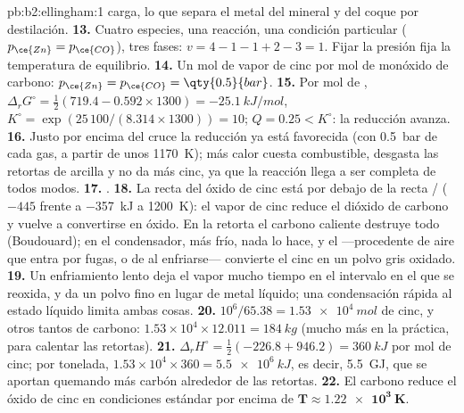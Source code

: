 \begin{solution}{pb:b2:ellingham:1}
carga, lo que separa el metal del mineral y del coque por destilación.
\textbf{13.} Cuatro especies, una reacción, una condición particular ($p_{\ce{Zn}} =
p_{\ce{CO}}$), tres fases: $v = 4 - 1 - 1 + 2 - 3 = 1$. Fijar la presión
fija la temperatura de equilibrio.
\textbf{14.} Un mol de vapor de cinc por mol de monóxido de carbono:
$p_{\ce{Zn}} = p_{\ce{CO}} = \qty{0.5}{bar}$.
\textbf{15.} Por mol de , $\Delta_r G^\circ = \frac12(719.4 - 0.592 \times
1300) = \qty{-25.1}{kJ/mol}$, $K^\circ = \exp(25\,100/(8.314 \times 1300)) = 10$;
$Q = 0.25 < K^\circ$: la reducción avanza.
\textbf{16.} Justo por encima del cruce la reducción ya está favorecida (con
\qty{0.5}{bar} de cada gas, a partir de unos \qty{1170}{K}); más calor cuesta combustible,
desgasta las retortas de arcilla y no da más cinc, ya que la reacción llega
a ser completa de todos modos.
\textbf{17.} .
\textbf{18.} La recta del óxido de cinc está por debajo de la recta /
($-445$ frente a \qty{-357}{kJ} a \qty{1200}{K}): el vapor de cinc reduce el dióxido
de carbono y vuelve a convertirse en óxido. En la retorta el carbono caliente destruye todo
 (Boudouard); en el condensador, más frío, nada lo hace, y el 
---procedente de aire que entra por fugas, o de  al enfriarse--- convierte el cinc en un
polvo gris oxidado.
\textbf{19.} Un enfriamiento lento deja el vapor mucho tiempo en el intervalo en el que
se reoxida, y da un polvo fino en lugar de metal líquido; una condensación rápida
al estado líquido limita ambas cosas.
\textbf{20.} $10^6/65.38 = \qty{1.53e4}{mol}$ de cinc, y otros tantos de carbono:
$1.53 \times 10^4 \times 12.011 = \qty{184}{kg}$ (mucho más en la práctica, para calentar las
retortas).
\textbf{21.} $\Delta_r H^\circ = \frac12(-226.8 + 946.2) = \qty{+360}{kJ}$ por
mol de cinc; por tonelada, $1.53 \times 10^4 \times 360 = \qty{5.5e6}{kJ}$, es decir,
\qty{5.5}{GJ}, que se aportan quemando más carbón alrededor de las retortas.
\textbf{22.} El carbono reduce el óxido de cinc en condiciones estándar por encima de
$\boldsymbol{T \approx \qty{1.22e3}{K}}$.
\end{solution}
